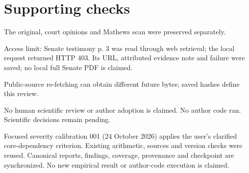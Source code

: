 \documentclass[10pt]{article}
\begin{document}
\section*{Supporting checks}
The original, court opinions and Mathews scan were preserved separately.\par
Access limit: Senate testimony p. 3 was read through web retrieval; the local request returned HTTP 403. Its URL, attributed evidence note and failure were saved; no local full Senate PDF is claimed.\par
Public-source re-fetching can obtain different future bytes; saved hashes define this review.\par
No human scientific review or author adoption is claimed. No author code ran. Scientific decisions remain pending.\par
Focused severity calibration 001 (24 October 2026) applies the user’s clarified core-dependency criterion. Existing arithmetic, sources and version checks were reused. Canonical reports, findings, coverage, provenance and checkpoint are synchronized. No new empirical result or author-code execution is claimed.\par
\end{document}
